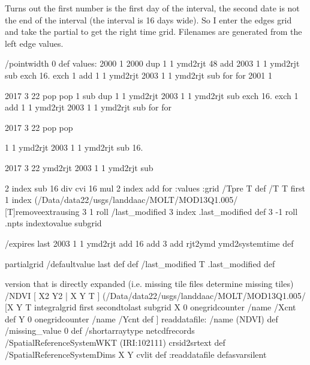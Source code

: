 Turns out the first number is the first day of the interval, the second date is
not the end of the interval (the interval is 16 days wide). 
So I enter the edges grid and take the partial to get the right time grid.
Filenames are generated from the left edge values.
\begin{ingrid}
/pointwidth 0 def
values:
2000 
1
2000
{
dup  1 1 ymd2rjt 48 add 2003 1 1 ymd2rjt sub
exch
16. exch
1 add 1 1 ymd2rjt 2003 1 1 ymd2rjt sub
{} for
} for
2001
1

2017 3 22 pop pop 1 sub
{
dup  1 1 ymd2rjt 2003 1 1 ymd2rjt sub
exch
16. exch
1 add 1 1 ymd2rjt 2003 1 1 ymd2rjt sub
{} for
} for


2017 3 22 pop pop

1 1 ymd2rjt 2003 1 1 ymd2rjt sub
16.


2017 3 22 ymd2rjt 2003 1 1 ymd2rjt sub

2 index 
     sub
    16 div
    cvi
    16 mul
2 index add
{} for
:values
:grid
/Tpre T def
/T T 
first
1 index
{(/Data/data22/usgs/landdaac/MOLT/MOD13Q1.005/%
 [T]}removeextrausing
3 1 roll
     /last_modified 3 index .last_modified def
     3 -1 roll
.npts indextovalue subgrid

\end{ingrid}
/expires last 2003 1 1 ymd2rjt add 16 add
3 add %
rjt2ymd ymd2systemtime
def
\begin{ingrid}

partialgrid
/defaultvalue {last} def
def
/last_modified T .last_modified def
\end{ingrid}
version that is directly expanded (i.e. missing tile files determine missing tiles)
/NDVI
{
[ X2 Y2 | X Y T ]
(/Data/data22/usgs/landdaac/MOLT/MOD13Q1.005/%
 [X Y T integralgrid first secondtolast subgrid X 0 onegridcounter /name /Xcnt def Y 0 onegridcounter  /name /Ycnt def ]
readdatafile:
/name (NDVI) def
/missing_value 0 def
/shortarraytype netcdfrecords
/SpatialReferenceSystemWKT (IRI:102111) crsid2srtext def
/SpatialReferenceSystemDims { X Y } cvlit  def
:readdatafile
} defasvarsilent
